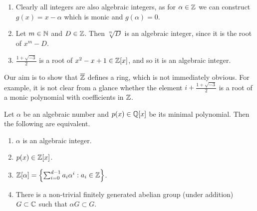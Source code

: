 \begin{examples}
	\begin{enumerate}
		\item
		Clearly all integers are also algebraic integers, as for $\alpha \in \mathbb{Z}$
		we can construct $g(x) = x - \alpha$ which is monic and $g(\alpha) = 0$.

		\item
		Let $m \in \mathbb{N}$ and $D \in \mathbb{Z}$.
		Then $\sqrt[m]{D}$ is an algebraic integer, since it is the root of
		$x^m - D$.	

		\item
		$\frac{1 + \sqrt{-3}}{2}$ is a root of $x^2 - x + 1 \in \mathbb{Z}[x]$,
		and so it is an algebraic integer.
	\end{enumerate}
\end{examples}

Our aim is to show that $\overline{\mathbb{Z}}$ defines a ring,
which is not immediately obvious.
For example, it is not clear from a glance whether the element
$i + \frac{1 + \sqrt{-3}}{2}$ is a root of a monic polynomial 
with coefficients in $\mathbb{Z}$.

\begin{theorem}[]
	Let $\alpha$ be an algebraic number and $p(x) \in \mathbb{Q}[x]$
	be its minimal polynomial.
	Then the following are equivalent.
	\begin{enumerate}
		\item $\alpha$ is an algebraic integer.
		\item $p(x) \in \mathbb{Z}[x]$.
		\item $
			\mathbb{Z}[\alpha] 
			= \left\{ \sum_{i=0}^{d-1} a_i\alpha^i : a_i \in \mathbb{Z} \right\}
		$.
	\item There is a non-trivial finitely generated abelian group (under
		addition) $G \subset \mathbb{C}$ such that $\alpha G \subset G$.
	\end{enumerate}
\end{theorem}
